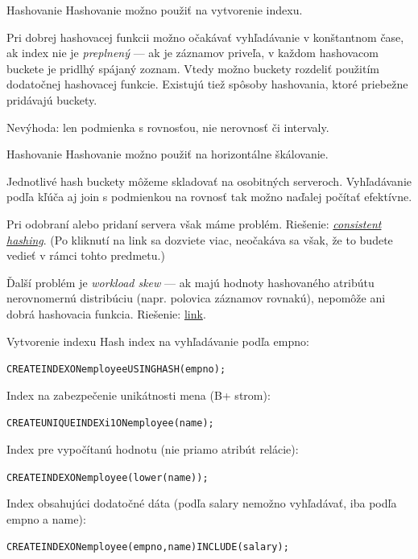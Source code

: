 \documentclass[12pt]{beamer}
\def\blue#1{\textcolor{Cerulean}{#1}}
\begin{document}
\begin{frame}[fragile]{Hashovanie}
Hashovanie možno použiť na vytvorenie indexu.
\bigskip

Pri dobrej hashovacej funkcii možno očakávať vyhľadávanie v konštantnom čase,
ak index nie je \emph{preplnený} --- ak je záznamov priveľa, v každom hashovacom buckete
je pridlhý spájaný zoznam. Vtedy možno buckety rozdeliť použitím dodatočnej hashovacej funkcie.
Existujú tiež spôsoby hashovania, ktoré priebežne pridávajú buckety.
\bigskip

Nevýhoda: len podmienka s rovnosťou, nie nerovnosť či intervaly.
\end{frame}

\begin{frame}[fragile]{Hashovanie}
Hashovanie možno použiť na horizontálne škálovanie.
\bigskip

Jednotlivé hash buckety môžeme skladovať na osobitných serveroch.
Vyhľadávanie podľa kľúča aj join s podmienkou na rovnosť tak možno naďalej počítať efektívne.
\bigskip

Pri odobraní alebo pridaní servera však máme problém. Riešenie:
\blue{\href{https://medium.datadriveninvestor.com/consistent-hashing-an-efficient-scalable-data-distribution-algorithm-a81fc5c0a6c7}{\emph{consistent hashing}}}.
(Po kliknutí na link sa dozviete viac, neočakáva sa však, že to budete vedieť v rámci tohto predmetu.)

\bigskip
Ďalší problém je \emph{workload skew} --- ak majú hodnoty hashovaného atribútu nerovnomernú distribúciu (napr. polovica záznamov rovnakú),
nepomôže ani dobrá hashovacia funkcia. Riešenie:
\href{https://scalablehuman.com/2022/06/05/how-to-relieve-hotspots-with-skewed-workloads/}{link}.
\end{frame}


\begin{frame}[fragile]{Vytvorenie indexu}
Hash index na vyhľadávanie podľa empno:
\begin{alltt}
  \blue{CREATE INDEX ON employee USING HASH (empno);}
\end{alltt}
Index na zabezpečenie unikátnosti mena (B+ strom):
\begin{alltt}
  \blue{CREATE UNIQUE INDEX i1 ON employee (name);}
\end{alltt}
Index pre vypočítanú hodnotu (nie priamo atribút relácie):
\begin{alltt}
  \blue{CREATE INDEX ON employee (lower(name));}
\end{alltt}
Index obsahujúci dodatočné dáta (podľa salary nemožno vyhľadávať, iba podľa empno a name):
{\small
\begin{alltt}
  \blue{CREATE INDEX ON employee (empno, name) INCLUDE (salary);}
\end{alltt}
}
\end{frame}
\end{document}
